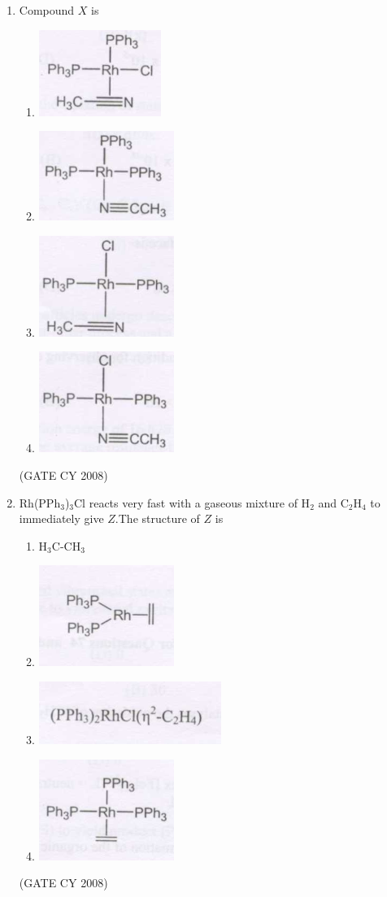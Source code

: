 \documentclass[12pt]{article}
\begin{document}
\begin{enumerate}
\item Compound $X$ is

\begin{enumerate}
\item \includegraphics[width=0.2\columnwidth]{figs/q76 a.png}
\item \includegraphics[width=0.2\columnwidth]{figs/q76 b.png}
\item \includegraphics[width=0.2\columnwidth]{figs/q76 c.png}
\item \includegraphics[width=0.2\columnwidth]{figs/q76 d.png}
\end{enumerate}    \hfill{(GATE CY 2008)}


\item Rh(PPh$_3$)$_3$Cl reacts very fast with a gaseous mixture of H$_2$ and C$_2$H$_4$ to immediately give $Z$.The structure of $Z$ is

\begin{enumerate}
\item H$_3$C-CH$_3$
\item \includegraphics[width=0.3\columnwidth]{figs/q77 b.png}
\item \includegraphics[width=0.3\columnwidth]{figs/q77 c.png}
\item \includegraphics[width=0.3\columnwidth]{figs/q77 d.png}
\end{enumerate}    \hfill{(GATE CY 2008)}



\end{enumerate}
\end{document}

